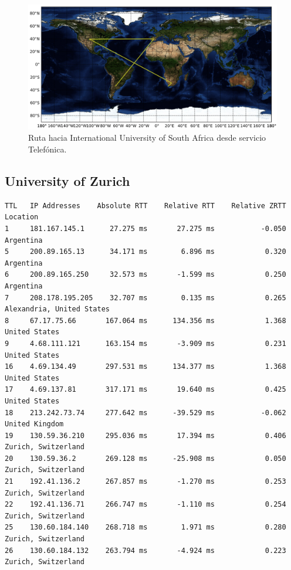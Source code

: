 \documentclass[10pt, a4paper]{article}
\begin{document}
\begin{figure}[H] %
\begin{center}
\includegraphics[width=400pt]{../imgs/map-unisa(telef).png}
\caption{Ruta hacia International University of South Africa desde servicio Telefónica.}
\end{center}
\end{figure}




\subsection{University of Zurich}

\begin{verbatim}
TTL   IP Addresses    Absolute RTT    Relative RTT    Relative ZRTT  Location
1     181.167.145.1      27.275 ms       27.275 ms           -0.050  Argentina
5     200.89.165.13      34.171 ms        6.896 ms            0.320  Argentina
6     200.89.165.250     32.573 ms       -1.599 ms            0.250  Argentina
7     208.178.195.205    32.707 ms        0.135 ms            0.265  Alexandria, United States
8     67.17.75.66       167.064 ms      134.356 ms            1.368  United States
9     4.68.111.121      163.154 ms       -3.909 ms            0.231  United States
16    4.69.134.49       297.531 ms      134.377 ms            1.368  United States
17    4.69.137.81       317.171 ms       19.640 ms            0.425  United States
18    213.242.73.74     277.642 ms      -39.529 ms           -0.062  United Kingdom
19    130.59.36.210     295.036 ms       17.394 ms            0.406  Zurich, Switzerland
20    130.59.36.2       269.128 ms      -25.908 ms            0.050  Zurich, Switzerland
21    192.41.136.2      267.857 ms       -1.270 ms            0.253  Zurich, Switzerland
22    192.41.136.71     266.747 ms       -1.110 ms            0.254  Zurich, Switzerland
25    130.60.184.140    268.718 ms        1.971 ms            0.280  Zurich, Switzerland
26    130.60.184.132    263.794 ms       -4.924 ms            0.223  Zurich, Switzerland

\end{verbatim}
\end{document}
